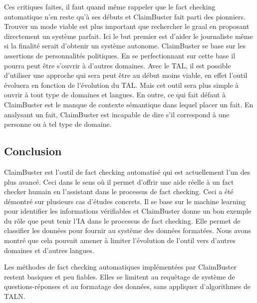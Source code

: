 Ces critiques faites, il faut quand même rappeler que le fact checking automatique n'en reste qu'à ses débuts et ClaimBuster fait parti des pionniers. Trouver un mode viable est plus important que rechercher le graal en proposant directement un système parfait. Ici le but premier est d'aider le journaliste même si la finalité serait d'obtenir un système autonome. ClaimBuster se base sur les assertions de personnalités politiques. En se perfectionnant sur cette base il pourra peut être s'ouvrir à d'autres domaines. Avec le TAL, il est possible d'utiliser une approche qui sera peut être au début moins viable, en effet l'outil évoluera en fonction de l'évolution du TAL. Mais cet outil sera plus simple à ouvrir à tout type de domaines et langues. En outre, ce qui fait défaut à ClaimBuster est le manque de contexte sémantique dans lequel placer un fait. En analysant un fait, ClaimBuster est incapable de dire s'il correspond à une personne ou à tel type de domaine.

\subsection{Conclusion}

ClaimBuster est l'outil de fact checking automatisé qui est actuellement l'un des plus avancé. Ceci dans le sens où il permet d'offrir une aide réelle à un fact checker humain en l'assistant dans le processus de fact checking. Ceci a été démontré sur plusieurs cas d'études concrets. Il se base sur le machine learning pour identifier les informations vérifiables et ClaimBuster donne un bon exemple du rôle que peut tenir l'IA dans le processus de fact checking. Elle permet de classifier les données pour fournir au système des données formatées. Nous avons montré que cela pouvait amener à limiter l'évolution de l'outil vers d'autres domaines et d'autres langues.

Les méthodes de fact checking automatiques implémentées par ClaimBuster restent basiques et peu fiables. Elles se limitent au requêtage de système de questions-réponses et au formatage des données, sans appliquer d'algorithmes de TALN.

